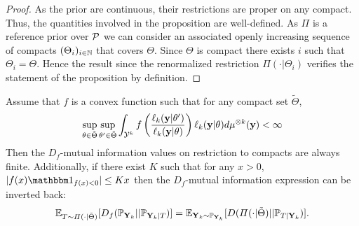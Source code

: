 \begin{proof}
    As the prior are continuous, their restrictions are proper on any compact. Thus, the quantities involved in the proposition are well-defined. 
    As $\varPi$ is a reference prior over $\mathcal{P}$ we can consider an associated openly increasing sequence of compacts $(\Theta_i)_{i\in\mathbb{N}}$ that covers $\Theta$. Since $\Theta$ is compact there exists $i$ such that $\Theta_i=\Theta$. Hence the result since the renormalized restriction $\varPi(\cdot|\Theta_i)$ verifies the statement of the proposition by definition.
\end{proof}

\begin{prop}[Invertibility]
    Assume that $f$ is a convex function such that %
    for any compact set $\tilde\Theta$,
        \begin{equation}
            \sup_{\theta\in\tilde\Theta}\sup_{\theta'\in\tilde\Theta} \int_{\mathcal{Y}^k} f\left(\frac{\ell_k(\mathbf{y}|\theta')}{\ell_k(\mathbf{y}|\theta)}  \right) \ell_k(\mathbf{y}|\theta) d\mu^{\otimes k}(\mathbf{y})<\infty
        \end{equation}
    Then the $D_f$-mutual information values on restriction to compacts are always finite. Additionally, if there exist $K$ such that for any $x>0$, $|f(x)\indic_{f(x)<0}|\leq Kx $ then the $D_f$-mutual information expression can be inverted back:
        \begin{equation}
            \mathbb{E}_{T\sim\varPi(\cdot|\tilde\Theta)}[D_f(\mathbb{P}_{\mathbf{Y}_k}||\mathbb{P}_{\mathbf{Y}_k|T})] 
                =\mathbb{E}_{\mathbf{Y}_k\sim\mathbb{P}_{\mathbf{Y}_k}} [D(\varPi(\cdot|\tilde\Theta)|| \mathbb{P}_{T|\mathbf{Y}_k} ) ]. 
        \end{equation}
\end{prop}

